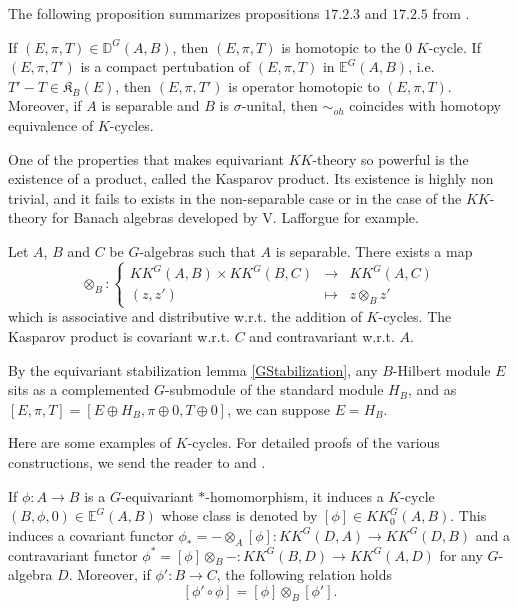 The following proposition summarizes propositions $17.2.3$ and $17.2.5$ from \cite{blackadar}. 
 
\begin{prop} If $(E,\pi,T)\in\mathbb D^G(A,B)$, then $(E,\pi,T)$ is homotopic to the $0$ $K$-cycle.
If $(E,\pi,T')$ is a compact pertubation of $(E,\pi,T)$ in $\mathbb E^G(A,B)$, i.e. $T'-T\in \mathfrak K_B(E)$, then $(E,\pi,T')$ is operator homotopic to $(E,\pi,T)$.\\
Moreover, if $A$ is separable and $B$ is $\sigma$-unital, then $\sim_{oh}$ coincides with homotopy equivalence of $K$-cycles.
\end{prop}

One of the properties that makes equivariant $KK$-theory so powerful is the existence of a product, called the Kasparov product. Its existence is highly non trivial, and it fails to exists in the non-separable case or in the case of the $KK$-theory for Banach algebras developed by V. Lafforgue \cite{Lafforgue} for example.

\begin{prop}\cite{LeGall} Let $A$, $B$ and $C$ be $G$-algebras such that $A$ is separable. There exists a map 
\[\otimes_B :\left\{\begin{array}{ccc} KK^G(A,B)\times KK^G(B,C) & \rightarrow & KK^G(A,C) \\ (z,z') & \mapsto & z\otimes_B z' \end{array}\right. \]
which is associative and distributive w.r.t. the addition of $K$-cycles. The Kasparov product is covariant w.r.t. $C$ and contravariant w.r.t. $A$.
\end{prop}

\begin{rk}
By the equivariant stabilization lemma \ref{GStabilization}, any $B$-Hilbert module $E$ sits as a complemented $G$-submodule of the standard module $H_B$, and as $[E,\pi,T] = [E \oplus H_B,\pi\oplus 0,T\oplus 0]$, we can suppose $E = H_B$.
\end{rk}

Here are some examples of $K$-cycles. For detailed proofs of the various constructions, we send the reader to \cite{blackadar} and \cite{LeGall}.

\begin{Expl}
If $\phi : A\rightarrow B$ is a $G$-equivariant $*$-homomorphism, it induces a $K$-cycle $(B,\phi,0)\in \mathbb E^G(A,B)$ whose class is denoted by $[\phi]\in KK_0^G(A,B)$. This induces a covariant functor $\phi_* = - \otimes_A [\phi] : KK^G(D,A)\rightarrow KK^G(D,B)$ and a contravariant functor $\phi^*=  [\phi] \otimes_B - : KK^G(B,D)\rightarrow KK^G(A,D)$ for any $G$-algebra $D$. Moreover, if $\phi' : B\rightarrow C$, the following relation holds 
\[ [\phi'\circ \phi] = [\phi]\otimes_B [\phi'].\]
\end{Expl}

